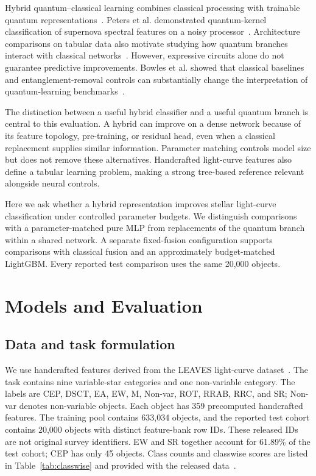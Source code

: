 \documentclass[aps,a4paper,onecolumn,11pt,unpublished]{quantumarticle}
\begin{document}
Hybrid quantum--classical learning combines classical processing with trainable quantum representations~\cite{mari2020}. Peters et al. demonstrated quantum-kernel classification of supernova spectral features on a noisy processor~\cite{peters2021}. Architecture comparisons on tabular data also motivate studying how quantum branches interact with classical networks~\cite{chenkuo2026}. However, expressive circuits alone do not guarantee predictive improvements. Bowles et al. showed that classical baselines and entanglement-removal controls can substantially change the interpretation of quantum-learning benchmarks~\cite{bowles2024}.

The distinction between a useful hybrid classifier and a useful quantum branch is central to this evaluation. A hybrid can improve on a dense network because of its feature topology, pre-training, or residual head, even when a classical replacement supplies similar information. Parameter matching controls model size but does not remove these alternatives. Handcrafted light-curve features also define a tabular learning problem, making a strong tree-based reference relevant alongside neural controls.

Here we ask whether a hybrid representation improves stellar light-curve classification under controlled parameter budgets. We distinguish comparisons with a parameter-matched pure MLP from replacements of the quantum branch within a shared network. A separate fixed-fusion configuration supports comparisons with classical fusion and an approximately budget-matched LightGBM. Every reported test comparison uses the same 20{,}000 objects.

\section{Models and Evaluation}

\subsection{Data and task formulation}


We use handcrafted features derived from the LEAVES light-curve dataset~\cite{leaves2024,leavesdata}. The task contains nine variable-star categories and one non-variable category. The labels are CEP, DSCT, EA, EW, M, Non-var, ROT, RRAB, RRC, and SR; Non-var denotes non-variable objects. Each object has 359 precomputed handcrafted features. The training pool contains 633{,}034 objects, and the reported test cohort contains 20{,}000 objects with distinct feature-bank row IDs. These released IDs are not original survey identifiers. EW and SR together account for 61.89\% of the test cohort; CEP has only 45 objects. Class counts and classwise scores are listed in Table~\ref{tab:classwise} and provided with the released data~\cite{artifacts}.
\end{document}
